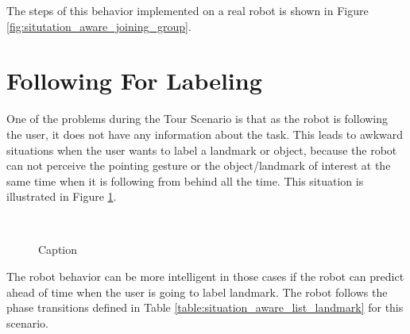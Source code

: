The steps of this behavior implemented on a real robot is shown in Figure \ref{fig:situtation_aware_joining_group}.

\section{Following For Labeling}
\label{sec:following_landmark_labeling}

One of the problems during the Tour Scenario is that as the robot is following the user, it does not have any information about the task. This leads to awkward situations when the user wants to label a landmark or object, because the robot can not perceive the pointing gesture or the object/landmark of interest at the same time when it is following from behind all the time. This situation is illustrated in Figure \ref{fig:landmark_labeling_example}.

\begin{figure}[ht!]
\centering
         \\
        \hspace*{3cm}
    \caption{Caption}
   \label{fig:landmark_labeling_example}
\end{figure}

 The robot behavior can be more intelligent in those cases if the robot can predict ahead of time when the user is going to label landmark. The robot follows the phase transitions defined in Table \ref{table:situation_aware_list_landmark} for this scenario.
 
